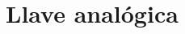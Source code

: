 \documentclass[../../ASSD_TP1_G7.tex]{subfiles}
\begin{document}
\chapter*{Llave anal\'ogica}
\end{document}
